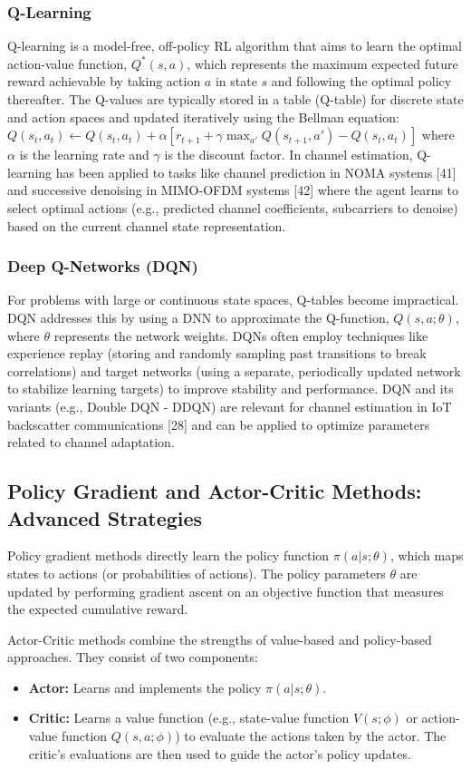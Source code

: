 \documentclass[journal,twocolumn]{IEEEtran}
\begin{document}
\subsubsection{Q-Learning}
Q-learning is a model-free, off-policy RL algorithm that aims to learn the optimal action-value function, $Q^*(s, a)$, which represents the maximum expected future reward achievable by taking action $a$ in state $s$ and following the optimal policy thereafter. The Q-values are typically stored in a table (Q-table) for discrete state and action spaces and updated iteratively using the Bellman equation:
$Q(s_t, a_t) \leftarrow Q(s_t, a_t) + \alpha [r_{t+1} + \gamma \max_{a'} Q(s_{t+1}, a') - Q(s_t, a_t)]$
where $\alpha$ is the learning rate and $\gamma$ is the discount factor.
In channel estimation, Q-learning has been applied to tasks like channel prediction in NOMA systems [41] and successive denoising in MIMO-OFDM systems [42] where the agent learns to select optimal actions (e.g., predicted channel coefficients, subcarriers to denoise) based on the current channel state representation.

\subsubsection{Deep Q-Networks (DQN)}
For problems with large or continuous state spaces, Q-tables become impractical. DQN addresses this by using a DNN to approximate the Q-function, $Q(s, a; \theta)$, where $\theta$ represents the network weights. DQNs often employ techniques like experience replay (storing and randomly sampling past transitions to break correlations) and target networks (using a separate, periodically updated network to stabilize learning targets) to improve stability and performance.
DQN and its variants (e.g., Double DQN - DDQN) are relevant for channel estimation in IoT backscatter communications [28] and can be applied to optimize parameters related to channel adaptation.

\subsection{Policy Gradient and Actor-Critic Methods: Advanced Strategies}
Policy gradient methods directly learn the policy function $\pi(a|s; \theta)$, which maps states to actions (or probabilities of actions). The policy parameters $\theta$ are updated by performing gradient ascent on an objective function that measures the expected cumulative reward.

Actor-Critic methods combine the strengths of value-based and policy-based approaches. They consist of two components:
\begin{itemize}
    \item \textbf{Actor:} Learns and implements the policy $\pi(a|s; \theta)$.
    \item \textbf{Critic:} Learns a value function (e.g., state-value function $V(s; \phi)$ or action-value function $Q(s,a; \phi)$) to evaluate the actions taken by the actor. The critic's evaluations are then used to guide the actor's policy updates.
\end{itemize}
\end{document}
